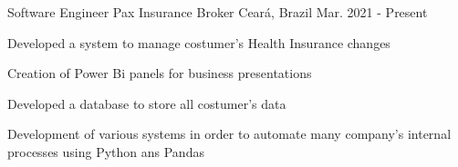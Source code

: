 \begin{cventries}
  \cventry
    {Software Engineer} %
    {Pax Insurance Broker} %
    {Ceará, Brazil} %
    {Mar. 2021 - Present} %
    {
      \begin{cvitems} %
        \item {Developed a system to manage costumer's Health Insurance changes}
        \item {Creation of Power Bi panels for business presentations}
        \item {Developed a database to store
        all costumer's data}
        \item {Development of various systems in order to automate many company's internal processes using Python ans Pandas}
      \end{cvitems}
    }

\end{cventries}
